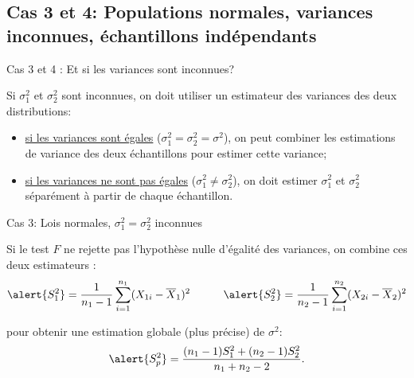 \documentclass{BeamerTemplate}
\begin{document}
\subsection{Cas 3 et 4: Populations normales, variances inconnues, échantillons indépendants}\label{sec:ttestindep}

\begin{frame}[t]{Cas 3 et 4 : Et si les variances sont inconnues?}

Si $\sigma^2_1$ et $\sigma^2_2$ sont inconnues, on doit utiliser un estimateur des variances des deux distributions:

\begin{itemize}
\item<1-> \underline{si les variances sont égales} ($\sigma^2_1 = \sigma^2_2 = \sigma^2$), on peut  \alert{combiner les estimations de variance des deux échantillons pour estimer cette variance};
\item<2-> \underline{si les variances ne sont pas égales} ($\sigma_1^2 \ne \sigma_2^2$), on doit \alert{estimer $\sigma^2_1$ et $\sigma^2_2$  séparément à partir de chaque échantillon}.
\end{itemize}

\end{frame}


\begin{frame}[t]{Cas 3: Lois normales, $\sigma^2_1 = \sigma^2_2$ inconnues}

{\small

Si le test $F$ \alert{ne rejette pas l'hypothèse nulle d'égalité des variances}, on \alert{combine} ces deux estimateurs :
$$\alert{S_1^2} = \frac{1}{n_1-1} \sum_{i=1}^{n_1}(X_{1i} - \overline{X}_1)^2 \qquad\quad \alert{S_2^2} = \frac{1}{n_2-1} \sum_{i=1}^{n_2}(X_{2i} - \overline{X}_2)^2$$

pour obtenir une estimation globale (plus précise) de $\sigma^2$:
$$
\alert{S_p^2} = \frac{(n_1-1)S_1^2 + (n_2-1)S_2^2}{n_1 + n_2 - 2}.
$$

\medskip
{}
}
\end{frame}
\end{document}
